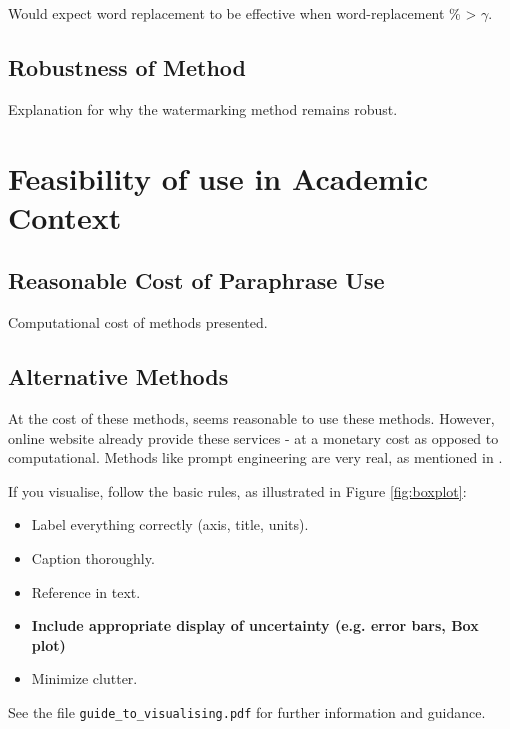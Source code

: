 \documentclass{l4proj}
\theoremstyle{definition}
\begin{document}
        Would expect word replacement to be effective when word-replacement \% > $\gamma$. 
    \subsection{Robustness of Method}
        Explanation for why the watermarking method remains robust.
\section{Feasibility of use in Academic Context}
    \subsection{Reasonable Cost of Paraphrase Use}
        Computational cost of methods presented.
    \subsection{Alternative Methods}
        At the cost of these methods, seems reasonable to use these methods. However, online website already provide these services - at a monetary cost as opposed to computational. Methods like prompt engineering are very real, as mentioned in \citet{kirchenbauer2023watermark}.

If you visualise, follow the basic rules, as illustrated in Figure \ref{fig:boxplot}:
\begin{itemize}
\item Label everything correctly (axis, title, units).
\item Caption thoroughly.
\item Reference in text.
\item \textbf{Include appropriate display of uncertainty (e.g. error bars, Box plot)}
\item Minimize clutter.
\end{itemize}

See the file \texttt{guide\_to\_visualising.pdf} for further information and guidance.


\end{document}
